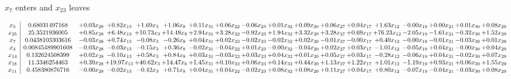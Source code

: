 \documentclass[9pt]{article}
\begin{document}
 $ x_{7} $ enters and $ x_{23} $ leaves 

 \[\begin{array}{c| c c@{\hskip 2pt} c@{\hskip 2pt} c@{\hskip 2pt} c@{\hskip 2pt} c@{\hskip 2pt} c@{\hskip 2pt} c@{\hskip 2pt} c@{\hskip 2pt} c@{\hskip 2pt} c@{\hskip 2pt} c@{\hskip 2pt} c@{\hskip 2pt} c@{\hskip 2pt} c@{\hskip 2pt} c@{\hskip 2pt} c@{\hskip 2pt} }
 x_{5}   &  0.68031497168 & +  0.03 x_{28} & +  0.82 x_{13} & +  1.69 x_{3} & +  1.06 x_{8} & +  0.11 x_{31} & +  0.06 x_{22} & -0.06 x_{23} & +  0.01 x_{32} & +  0.09 x_{20} & +  0.06 x_{27} & +  0.04 x_{17} & +  1.63 x_{12} & -0.00 x_{19} & +  0.00 x_{21} & +  0.01 x_{30} & +  0.08 x_{29}\\
 x_{25}   &  25.3521936005 & +  0.85 x_{28} & +  6.48 x_{13} & + 10.73 x_{3} & + 14.49 x_{8} & +  2.94 x_{31} & +  3.28 x_{22} & -0.92 x_{23} & +  1.94 x_{32} & +  3.32 x_{20} & +  3.28 x_{27} & +  0.69 x_{17} & + 76.23 x_{12} & -2.05 x_{19} & -1.61 x_{21} & -0.32 x_{30} & +  1.52 x_{29}\\
 x_{7}   &  0.0438103303616 & -0.03 x_{28} & +  0.74 x_{13} & -0.08 x_{3} & -0.26 x_{8} & +  0.04 x_{31} & +  0.02 x_{22} & -0.02 x_{23} & -0.02 x_{32} & +  0.02 x_{20} & -0.01 x_{27} & -0.00 x_{17} & +  0.40 x_{12} & -0.00 x_{19} & -0.01 x_{21} & -0.03 x_{30} & +  0.01 x_{29}\\
 x_{4}   &  0.00845489901608 & -0.03 x_{28} & -0.03 x_{13} & -0.15 x_{3} & +  0.36 x_{8} & -0.02 x_{31} & -0.04 x_{22} & +  0.01 x_{23} & -0.00 x_{32} & -0.04 x_{20} & +  0.02 x_{27} & +  0.03 x_{17} & -1.01 x_{12} & -0.05 x_{19} & +  0.04 x_{21} & -0.00 x_{30} & +  0.04 x_{29}\\
 x_{14}   &  0.132624508399 & +  0.02 x_{28} & -0.10 x_{13} & +  0.58 x_{3} & +  0.84 x_{8} & +  0.03 x_{31} & -0.03 x_{22} & +  0.03 x_{23} & +  0.04 x_{32} & +  0.01 x_{20} & +  0.05 x_{27} & +  0.03 x_{17} & -0.28 x_{12} & -0.06 x_{19} & +  0.04 x_{21} & -0.02 x_{30} & +  0.07 x_{29}\\
 x_{18}   &  11.3346254463 & +  0.39 x_{28} & + 19.97 x_{13} & + 40.62 x_{3} & + 14.47 x_{8} & +  1.45 x_{31} & +  0.10 x_{22} & +  0.06 x_{23} & +  0.14 x_{32} & +  0.44 x_{20} & +  1.13 x_{27} & +  1.22 x_{17} & +  1.01 x_{12} & -1.19 x_{19} & +  0.93 x_{21} & +  0.06 x_{30} & +  1.55 x_{29}\\
 x_{11}   &  0.458380876716 & -0.00 x_{28} & -0.02 x_{13} & -0.42 x_{3} & +  0.71 x_{8} & +  0.04 x_{31} & +  0.04 x_{22} & -0.02 x_{23} & +  0.08 x_{32} & +  0.08 x_{20} & +  0.11 x_{27} & +  0.04 x_{17} & +  0.80 x_{12} & -0.07 x_{19} & -0.04 x_{21} & -0.03 x_{30} & +  0.08 x_{29}\\

\end{array}\]
\end{document}
